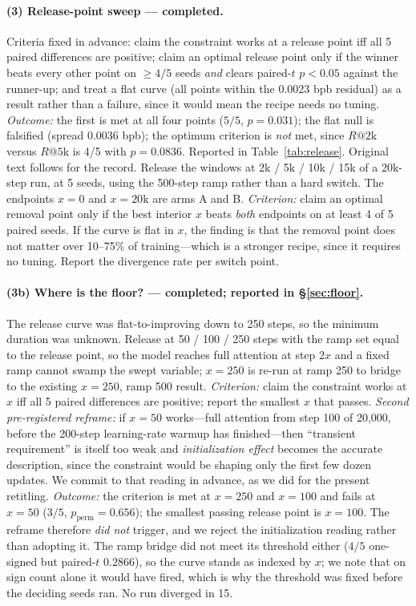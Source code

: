 \documentclass[11pt,a4paper]{article}
\begin{document}
\paragraph{(3) Release-point sweep --- \textnormal{completed}.} Criteria fixed in advance: claim the constraint works at a release point iff all 5 paired differences are positive; claim an optimal release point only if the winner beats every other point on $\geq4/5$ seeds \emph{and} clears paired-$t$ $p<0.05$ against the runner-up; and treat a flat curve (all points within the 0.0023 bpb residual) as a result rather than a failure, since it would mean the recipe needs no tuning. \emph{Outcome:} the first is met at all four points ($5/5$, $p=0.031$); the flat null is falsified (spread 0.0036 bpb); the optimum criterion is \emph{not} met, since $R@2$k versus $R@5$k is 4/5 with $p=0.0836$. Reported in Table~\ref{tab:release}. Original text follows for the record. Release the windows at 2k / 5k / 10k / 15k of a 20k-step run, at 5 seeds, using the 500-step ramp rather than a hard switch. The endpoints $x=0$ and $x=20\text{k}$ are arms A and B. \emph{Criterion:} claim an optimal removal point only if the best interior $x$ beats \emph{both} endpoints on at least 4 of 5 paired seeds. If the curve is flat in $x$, the finding is that the removal point does not matter over 10--75\% of training---which is a stronger recipe, since it requires no tuning. Report the divergence rate per switch point.

\paragraph{(3b) Where is the floor? --- \textnormal{completed}; reported in \S\ref{sec:floor}.} The release curve was flat-to-improving down to 250 steps, so the minimum duration was unknown. Release at 50 / 100 / 250 steps with the ramp set equal to the release point, so the model reaches full attention at step $2x$ and a fixed ramp cannot swamp the swept variable; $x=250$ is re-run at ramp 250 to bridge to the existing $x=250$, ramp 500 result. \emph{Criterion:} claim the constraint works at $x$ iff all 5 paired differences are positive; report the smallest $x$ that passes. \emph{Second pre-registered reframe:} if $x=50$ works---full attention from step 100 of 20{,}000, before the 200-step learning-rate warmup has finished---then ``transient requirement'' is itself too weak and \emph{initialization effect} becomes the accurate description, since the constraint would be shaping only the first few dozen updates. We commit to that reading in advance, as we did for the present retitling. \emph{Outcome:} the criterion is met at $x=250$ and $x=100$ and fails at $x=50$ ($3/5$, $p_{\text{perm}}=0.656$); the smallest passing release point is $x=100$. The reframe therefore \emph{did not} trigger, and we reject the initialization reading rather than adopting it. The ramp bridge did not meet its threshold either ($4/5$ one-signed but paired-$t$ $0.2866$), so the curve stands as indexed by $x$; we note that on sign count alone it would have fired, which is why the threshold was fixed before the deciding seeds ran. No run diverged in 15.
\end{document}
